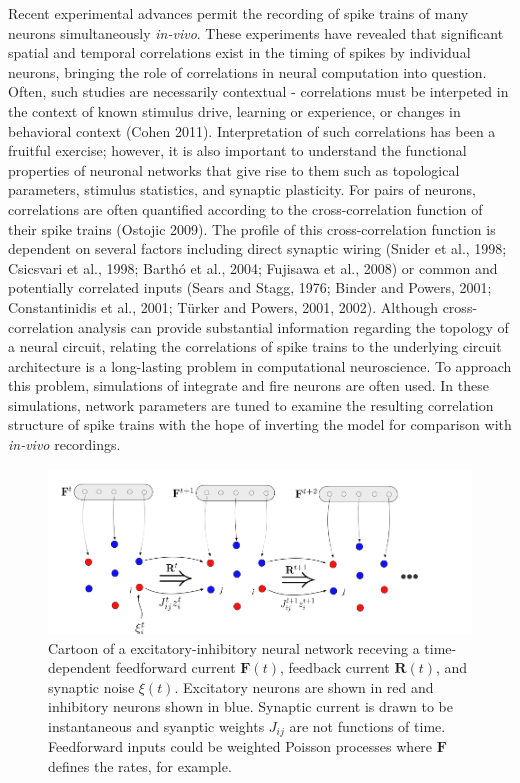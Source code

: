 \documentclass{ucetd}
\begin{document}
Recent experimental advances permit the recording of spike trains of many neurons simultaneously \emph{in-vivo}. These experiments have revealed that significant spatial and temporal correlations exist in the timing of spikes by individual neurons, bringing the role of correlations in neural computation into question. Often, such studies are necessarily contextual - correlations must be interpeted in the context of known stimulus drive, learning or experience, or changes in behavioral context (Cohen 2011). Interpretation of such correlations has been a fruitful exercise; however, it is also important to understand the functional properties of neuronal networks that give rise to them such as topological parameters, stimulus statistics, and synaptic plasticity. For pairs of neurons, correlations are often quantified according to the cross-correlation function of their spike trains (Ostojic 2009). The profile of this cross-correlation function is dependent on several factors including direct synaptic wiring (Snider et al., 1998; Csicsvari et al., 1998; Barthó et al., 2004; Fujisawa et al., 2008) or common and potentially correlated inputs (Sears and Stagg, 1976; Binder and Powers, 2001; Constantinidis et al., 2001; Türker and Powers, 2001, 2002). Although cross-correlation analysis can provide substantial information regarding the topology of a neural circuit, relating the correlations of spike trains to the underlying circuit architecture is a long-lasting problem in computational neuroscience. To approach this problem, simulations of integrate and fire neurons are often used. In these simulations, network parameters are tuned to examine the resulting correlation structure of spike trains with the hope of inverting the model for comparison with \emph{in-vivo} recordings. 

\begin{figure}[t!]
\centering
\includegraphics[width=175mm]{figure-1}
\caption{Cartoon of a excitatory-inhibitory neural network receving a time-dependent feedforward current $\mathbf{F}(t)$, feedback current $\mathbf{R}(t)$, and synaptic noise $\xi(t)$. Excitatory neurons are shown in red and inhibitory neurons shown in blue. Synaptic current is drawn to be instantaneous and syanptic weights $J_{ij}$ are not functions of time. Feedforward inputs could be weighted Poisson processes where $\mathbf{F}$ defines the rates, for example.}
\end{figure}
\end{document}
